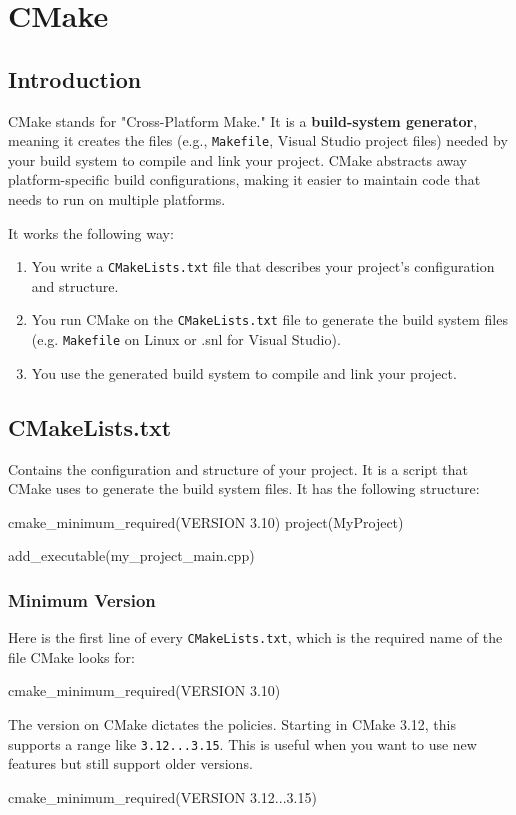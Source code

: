 \section{CMake}

\subsection{Introduction}

CMake stands for "Cross-Platform Make." It is a \textbf{build-system generator}, meaning it creates the files (e.g., \texttt{Makefile}, Visual Studio project files) needed by your build system to compile and link your project.
CMake abstracts away platform-specific build configurations, making it easier to maintain code that needs to run on multiple platforms.

It works the following way:
\begin{enumerate}
    \item You write a \texttt{CMakeLists.txt} file that describes your project's configuration and structure.
    \item You run CMake on the \texttt{CMakeLists.txt} file to generate the build system files (e.g. \texttt{Makefile} on Linux or .snl for Visual Studio).
    \item You use the generated build system to compile and link your project.
\end{enumerate}

\subsection{CMakeLists.txt}

Contains the configuration and structure of your project. It is a script that CMake uses to generate the build system files.
It has the following structure:

\begin{codeblock}[language=bash][language=C++, numbers=none]
cmake_minimum_required(VERSION 3.10) 
project(MyProject)  

add_executable(my_project_main.cpp) 
\end{codeblock}

\subsubsection{Minimum Version}

Here is the first line of every \texttt{CMakeLists.txt}, which is the required name of the file CMake looks for:
\begin{codeblock}[language=bash][numbers=none]
cmake_minimum_required(VERSION 3.10)
\end{codeblock}
The version on CMake dictates the policies. Starting in CMake 3.12, this supports
a range like \texttt{3.12...3.15}. This is useful when you want to use new features but still support older versions.
\begin{codeblock}[language=bash][numbers=none]
cmake_minimum_required(VERSION 3.12...3.15)
\end{codeblock}

